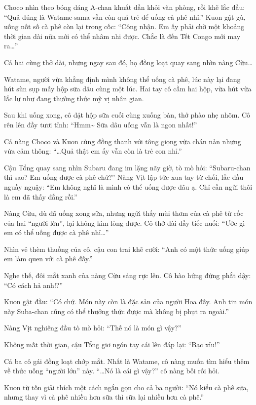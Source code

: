 \documentclass[../main.tex]{subfiles}
\begin{document}
Choco nhìn theo bóng dáng A-chan khuất dần khỏi văn phòng, rồi khẽ lắc đầu: ``Quả đúng là Watame-sama vẫn còn quá trẻ để uống cà phê nhỉ.'' Kuon gật gù, uống nốt số cà phê còn lại trong cốc: ``Công nhận. Em ấy phải chờ một khoảng thời gian dài nữa mới có thể nhâm nhi được. Chắc là đến Tết Congo mới may ra\dots''

Cả hai cùng thở dài, nhưng ngay sau đó, họ đồng loạt quay sang nhìn nàng Cừu\dots

Watame, người vừa khẳng định mình không thể uống cà phê, lúc này lại đang hút sùn sụp mấy hộp sữa dâu cùng một lúc. Hai tay cô cầm hai hộp, vừa hút vừa lắc lư như đang thưởng thức mỹ vị nhân gian.


Sau khi uống xong, cô đặt hộp sữa cuối cùng xuống bàn, thở phào nhẹ nhõm. Cô rên lên đầy tươi tỉnh: ``Hmm\~{} Sữa dâu uống vẫn là ngon nhất!''

Cả nàng Choco và Kuon cùng đồng thanh với tông giọng vừa chán nản nhưng vừa cảm thông: ``\dots Quả thật em ấy vẫn còn là trẻ con nhỉ.''

Cậu Tổng quay sang nhìn Subaru đang im lặng nãy giờ, tò mò hỏi: ``Subaru-chan thì sao? Em uống được cà phê chứ?'' Nàng Vịt lập tức xua tay từ chối, lắc đầu nguầy nguậy: ``Em không nghĩ là mình có thể uống được đâu ạ. Chỉ cần ngửi thôi là em đã thấy đắng rồi.''

Nàng Cừu, dù đã uống xong sữa, nhưng ngửi thấy mùi thơm của cà phê từ cốc của hai ``người lớn'', lại không kìm lòng được. Cô thở dài đầy tiếc nuối: ``Ước gì em có thể uống được cà phê nhỉ\dots''

Nhìn vẻ thèm thuồng của cô, cậu con trai khẽ cười: ``Anh có một thức uống giúp em làm quen với cà phê đấy.''

Nghe thế, đôi mắt xanh của nàng Cừu sáng rực lên. Cô hào hứng đứng phắt dậy: ``Có cách hả anh!?''

Kuon gật đầu: ``Có chứ. Món này còn là đặc sản của người Hoa đấy. Anh tin món này Suba-chan cũng có thể thưởng thức được mà không bị phụt ra ngoài.''

Nàng Vịt nghiêng đầu tò mò hỏi: ``Thế nó là món gì vậy?''

Không mất thời gian, cậu Tổng giơ ngón tay cái lên đáp lại: ``Bạc xỉu!''

Cả ba cô gái đồng loạt chớp mắt. Nhất là Watame, cô nàng muốn tìm hiểu thêm về thức uống ``người lớn'' này. ``\dots Nó là cái gì vậy?'' cô nàng bối rối hỏi.

Kuon từ tốn giải thích một cách ngắn gọn cho cả ba người: ``Nó kiểu cà phê sữa, nhưng thay vì cà phê nhiều hơn sữa thì sữa lại nhiều hơn cà phê.''
\end{document}
